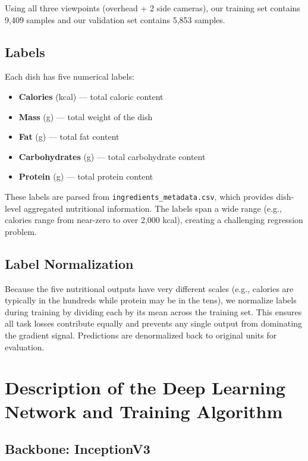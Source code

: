\documentclass[11pt,a4paper]{article}
\begin{document}
Using all three viewpoints (overhead + 2 side cameras), our training set contains 9,409 samples and our validation set contains 5,853 samples.

\subsection{Labels}

Each dish has five numerical labels:
\begin{itemize}
  \item \textbf{Calories} (kcal) --- total caloric content
  \item \textbf{Mass} (g) --- total weight of the dish
  \item \textbf{Fat} (g) --- total fat content
  \item \textbf{Carbohydrates} (g) --- total carbohydrate content
  \item \textbf{Protein} (g) --- total protein content
\end{itemize}

These labels are parsed from \texttt{ingredients\_metadata.csv}, which provides dish-level aggregated nutritional information. The labels span a wide range (e.g., calories range from near-zero to over 2,000 kcal), creating a challenging regression problem.

\subsection{Label Normalization}

Because the five nutritional outputs have very different scales (e.g., calories are typically in the hundreds while protein may be in the tens), we normalize labels during training by dividing each by its mean across the training set. This ensures all task losses contribute equally and prevents any single output from dominating the gradient signal. Predictions are denormalized back to original units for evaluation.

\section{Description of the Deep Learning Network and Training Algorithm}
\label{sec:network}

\subsection{Backbone: InceptionV3}
\end{document}
